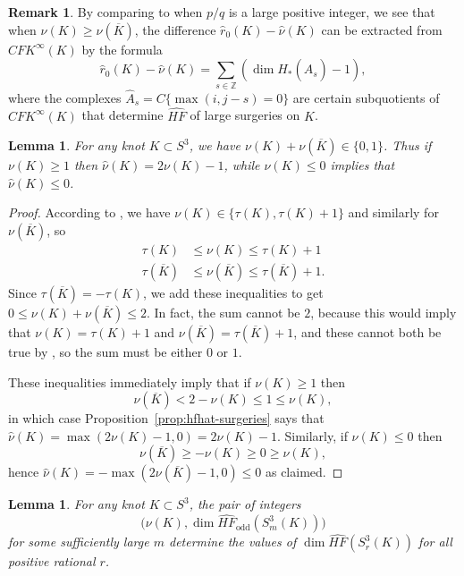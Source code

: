 \documentclass[11pt]{amsart}
\newtheorem {lemma}[theorem]{Lemma}
\numberwithin{equation}{section}
\numberwithin{theorem}{section}
\theoremstyle{definition}
\newtheorem{remark}[theorem]{Remark}
\newcommand{\Z}{\mathbb{Z}}
\newcommand\cfk{\mathit{CFK}}
\newcommand\cfkinfty{\cfk^\infty}
\newcommand{\hfhat}{\widehat{\mathit{HF}}}
\newcommand{\godd}{\mathrm{odd}}
\newcommand{\mirror}[1]{\overline{#1}}
\begin{document}
\begin{remark}
By comparing \cite[Proposition~10.1]{bs-concordance} to \cite[Proposition~9.6]{osz-rational} when $p/q$ is a large positive integer, we see that when $\nu(K) \geq \nu(\mirror{K})$, the difference $\hat{r}_0(K) - \hat{\nu}(K)$ can be extracted from $\cfkinfty(K)$ by the formula
\[ \hat{r}_0(K) - \hat{\nu}(K) = \sum_{s\in\Z} (\dim H_*(\hat{A}_s)-1), \]
where the complexes $\hat{A}_s = C\{\max(i,j-s)=0\}$ are certain subquotients of $\cfkinfty(K)$ that determine $\hfhat$ of large surgeries on $K$.
\end{remark}

\begin{lemma} \label{lem:sum-nu-mirror}
For any knot $K \subset S^3$, we have $\nu(K)+\nu(\mirror{K}) \in \{0,1\}$.  Thus if $\nu(K) \geq 1$ then $\hat\nu(K) = 2\nu(K)-1$, while $\nu(K) \leq 0$ implies that $\hat\nu(K) \leq 0$.
\end{lemma}

\begin{proof}
According to \cite[Equation~(34)]{osz-rational}, we have $\nu(K) \in \{\tau(K),\tau(K)+1\}$ and similarly for $\nu(\mirror{K})$, so
\begin{align*}
\tau(K) &\leq \nu(K) \leq \tau(K)+1 \\
\tau(\mirror{K}) & \leq \nu(\mirror{K}) \leq \tau(\mirror{K})+1.
\end{align*}
Since $\tau(\mirror{K}) = -\tau(K)$, we add these inequalities to get $0 \leq \nu(K)+\nu(\mirror{K}) \leq 2$.  In fact, the sum cannot be $2$, because this would imply that $\nu(K)=\tau(K)+1$ and $\nu(\mirror{K})=\tau(\mirror{K})+1$, and these cannot both be true by \cite[\S3]{hom-smooth-concordance}, so the sum must be either $0$ or $1$.

These inequalities immediately imply that if $\nu(K) \geq 1$ then
\[ \nu(\mirror{K}) < 2-\nu(K) \leq 1 \leq \nu(K), \]
in which case Proposition~\ref{prop:hfhat-surgeries} says that $\hat\nu(K) = \max(2\nu(K)-1,0) = 2\nu(K)-1$.  Similarly, if $\nu(K) \leq 0$ then
\[ \nu(\mirror{K}) \geq -\nu(K) \geq 0 \geq \nu(K), \]
hence $\hat\nu(K) = -\max(2\nu(\mirror{K})-1,0) \leq 0$ as claimed.
\end{proof}

\begin{lemma} \label{lem:rational-dim-nu-hfodd}
For any knot $K \subset S^3$, the pair of integers
\[ \big(\nu(K), \dim \hfhat_\godd(S^3_m(K))\big) \]
for some sufficiently large $m$ determine the values of $\dim \hfhat(S^3_r(K))$ for all positive rational $r$.
\end{lemma}
\end{document}
